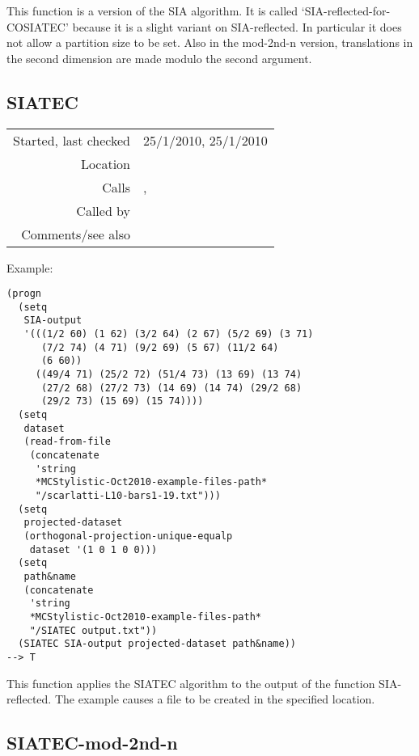 \noindent This function is a version of the SIA
algorithm. It is called `SIA-reflected-for-COSIATEC'
because it is a slight variant on SIA-reflected. In
particular it does not allow a partition size to be
set. Also in the mod-2nd-n version, translations in
the second dimension are made modulo the second
argument.


\subsection*{SIATEC}\label{fun:SIATEC}

\vspace{0.3cm}
\begin{tabular}{r|p{8cm}}
Started, last checked & 25/1/2010, 25/1/2010 \\
Location & \nameref{sec:further-structural-induction-algorithms} \\
Calls & \nameref{fun:translators-of-pattern-in-dataset}, \nameref{fun:write-to-file} \\
Called by & \nameref{fun:COSIATEC} \\
Comments/see also & \nameref{fun:SIATEC-mod-2nd-n}
\end{tabular}

\vspace{0.5cm}
\noindent Example:
\begin{verbatim}
(progn
  (setq
   SIA-output
   '(((1/2 60) (1 62) (3/2 64) (2 67) (5/2 69) (3 71)
      (7/2 74) (4 71) (9/2 69) (5 67) (11/2 64)
      (6 60))
     ((49/4 71) (25/2 72) (51/4 73) (13 69) (13 74)
      (27/2 68) (27/2 73) (14 69) (14 74) (29/2 68)
      (29/2 73) (15 69) (15 74))))
  (setq
   dataset
   (read-from-file
    (concatenate
     'string
     *MCStylistic-Oct2010-example-files-path*
     "/scarlatti-L10-bars1-19.txt")))
  (setq
   projected-dataset
   (orthogonal-projection-unique-equalp
    dataset '(1 0 1 0 0)))
  (setq
   path&name
   (concatenate
    'string
    *MCStylistic-Oct2010-example-files-path*
    "/SIATEC output.txt"))
  (SIATEC SIA-output projected-dataset path&name))
--> T
\end{verbatim}

\noindent This function applies the SIATEC algorithm
to the output of the function SIA-reflected. The
example causes a file to be created in the specified
location.


\subsection*{SIATEC-mod-2nd-n}\label{fun:SIATEC-mod-2nd-n}

